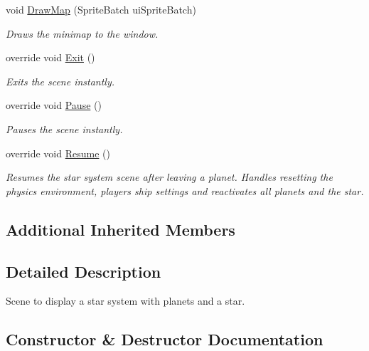 \begin{DoxyCompactItemize}
void \hyperlink{class_midnight_blue_1_1_star_system_scene_a8ce5e552f65d43e0326644e069dc6c24}{Draw\+Map} (Sprite\+Batch ui\+Sprite\+Batch)
\begin{DoxyCompactList}\small\item\em Draws the minimap to the window. \end{DoxyCompactList}\item 
override void \hyperlink{class_midnight_blue_1_1_star_system_scene_ad533ba93e597964d015099031a85cb77}{Exit} ()
\begin{DoxyCompactList}\small\item\em Exits the scene instantly. \end{DoxyCompactList}\item 
override void \hyperlink{class_midnight_blue_1_1_star_system_scene_a04e8bfcb31eebfd859c4bd543f0bb6f9}{Pause} ()
\begin{DoxyCompactList}\small\item\em Pauses the scene instantly. \end{DoxyCompactList}\item 
override void \hyperlink{class_midnight_blue_1_1_star_system_scene_aefbf0750a7ce153b923bcabb132e4875}{Resume} ()
\begin{DoxyCompactList}\small\item\em Resumes the star system scene after leaving a planet. Handles resetting the physics environment, players ship settings and reactivates all planets and the star. \end{DoxyCompactList}\end{DoxyCompactItemize}
\subsection*{Additional Inherited Members}


\subsection{Detailed Description}
Scene to display a star system with planets and a star. 



\subsection{Constructor \& Destructor Documentation}
\hypertarget{class_midnight_blue_1_1_star_system_scene_a630b2de039b719d35fbdf572bbc69ea0}{}\label{class_midnight_blue_1_1_star_system_scene_a630b2de039b719d35fbdf572bbc69ea0} 
